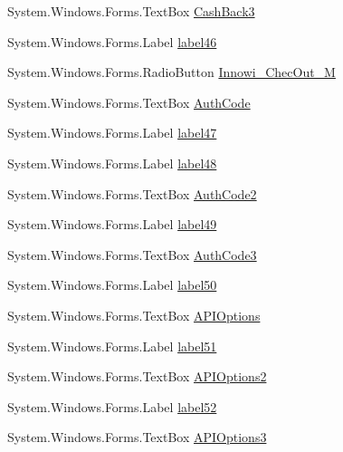 \begin{DoxyCompactItemize}
\item 
System.\+Windows.\+Forms.\+Text\+Box \mbox{\hyperlink{class_cert_complete_1_1_test___creation___form_aee4a3768b41a78e4cf740bf1ee72fcf5}{Cash\+Back3}}
\item 
System.\+Windows.\+Forms.\+Label \mbox{\hyperlink{class_cert_complete_1_1_test___creation___form_a6086c0d390c7bce81687a5c124ed3056}{label46}}
\item 
System.\+Windows.\+Forms.\+Radio\+Button \mbox{\hyperlink{class_cert_complete_1_1_test___creation___form_a4894239cb33e025221b7de6a2f501634}{Innowi\+\_\+\+Chec\+Out\+\_\+M}}
\item 
System.\+Windows.\+Forms.\+Text\+Box \mbox{\hyperlink{class_cert_complete_1_1_test___creation___form_a85c17d54af7607df3d0ea13473c2c48d}{Auth\+Code}}
\item 
System.\+Windows.\+Forms.\+Label \mbox{\hyperlink{class_cert_complete_1_1_test___creation___form_a45f264bbb5941f88b4f00ee1580cd87e}{label47}}
\item 
System.\+Windows.\+Forms.\+Label \mbox{\hyperlink{class_cert_complete_1_1_test___creation___form_a918b1880dffc14e013b25fac44979e35}{label48}}
\item 
System.\+Windows.\+Forms.\+Text\+Box \mbox{\hyperlink{class_cert_complete_1_1_test___creation___form_ae63d02212395bae5e98cc3489fc9b20f}{Auth\+Code2}}
\item 
System.\+Windows.\+Forms.\+Label \mbox{\hyperlink{class_cert_complete_1_1_test___creation___form_abd29d93fb1af37665c8323c93f053ad2}{label49}}
\item 
System.\+Windows.\+Forms.\+Text\+Box \mbox{\hyperlink{class_cert_complete_1_1_test___creation___form_a8d10fee48fe3c291d1959a96525d4bfc}{Auth\+Code3}}
\item 
System.\+Windows.\+Forms.\+Label \mbox{\hyperlink{class_cert_complete_1_1_test___creation___form_abe4e56759044ee7132798d8925e554ba}{label50}}
\item 
System.\+Windows.\+Forms.\+Text\+Box \mbox{\hyperlink{class_cert_complete_1_1_test___creation___form_ac77fc5bb546eb56f8e804234b71f61d7}{A\+P\+I\+Options}}
\item 
System.\+Windows.\+Forms.\+Label \mbox{\hyperlink{class_cert_complete_1_1_test___creation___form_aeaa3e51c2e64af59a8cc50022795889b}{label51}}
\item 
System.\+Windows.\+Forms.\+Text\+Box \mbox{\hyperlink{class_cert_complete_1_1_test___creation___form_a95dcb6341198a9b779f47e69a9873288}{A\+P\+I\+Options2}}
\item 
System.\+Windows.\+Forms.\+Label \mbox{\hyperlink{class_cert_complete_1_1_test___creation___form_a454ed1b3d715ca753ef746fc8a3e2006}{label52}}
\item 
System.\+Windows.\+Forms.\+Text\+Box \mbox{\hyperlink{class_cert_complete_1_1_test___creation___form_af887d72896b54879893296542f25a2c1}{A\+P\+I\+Options3}}
\end{DoxyCompactItemize}


